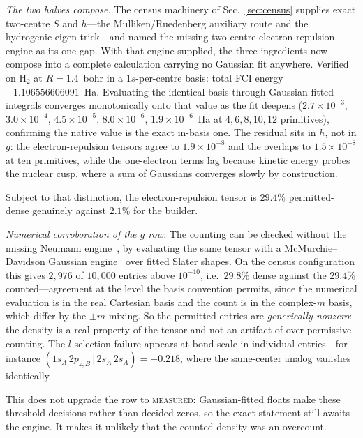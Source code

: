 \documentclass[aps,pra,twocolumn,superscriptaddress,longbibliography]{revtex4-2}
\begin{document}
\emph{The two halves compose.}  The census machinery of
Sec.~\ref{sec:census} supplies exact two-centre $S$ and $h$---the
Mulliken/Ruedenberg auxiliary route and the hydrogenic eigen-trick---and
named the missing two-centre electron-repulsion engine as its one gap.
With that engine supplied, the three ingredients now compose into a
complete calculation carrying no Gaussian fit anywhere.  Verified on
$\mathrm{H}_2$ at $R = 1.4$~bohr in a $1s$-per-centre basis: total FCI
energy $-1.106556606091$~Ha.  Evaluating the identical basis through
Gaussian-fitted integrals converges monotonically onto that value as the
fit deepens ($2.7\times10^{-3}$, $3.0\times10^{-4}$, $4.5\times10^{-5}$,
$8.0\times10^{-6}$, $1.9\times10^{-6}$~Ha at $4, 6, 8, 10, 12$
primitives), confirming the native value is the exact in-basis one.  The residual
sits in $h$, not in $g$: the electron-repulsion tensors agree to
$1.9\times10^{-8}$ and the overlaps to $1.5\times10^{-8}$ at ten
primitives, while the one-electron terms lag because kinetic energy probes
the nuclear cusp, where a sum of Gaussians converges slowly by
construction.

Subject to that distinction, the electron-repulsion tensor is $29.4\%$
permitted-dense genuinely against $2.1\%$ for the builder.

\emph{Numerical corroboration of the $g$ row.} The counting can be checked
without the missing Neumann engine~\cite{ruedenberg1951}, by evaluating
the same tensor with a
McMurchie--Davidson Gaussian engine~\cite{mcmurchie1978} over fitted
Slater shapes.  On the
census configuration this gives $2{,}976$ of $10{,}000$ entries above
$10^{-10}$, i.e.\ $29.8\%$ dense against the $29.4\%$ counted---agreement
at the level the basis convention permits, since the numerical evaluation
is in the real Cartesian basis and the count is in the complex-$m$ basis,
which differ by the $\pm m$ mixing.  So the permitted entries are
\emph{generically nonzero}: the density is a real property of the tensor
and not an artifact of over-permissive counting.  The
$l$-selection failure appears at bond scale in individual entries---for
instance $(1s_A\,2p_{z,B} \,|\, 2s_A\,2s_A) = -0.218$, where the
same-center analog vanishes identically.

This does not upgrade the row to \textsc{measured}: Gaussian-fitted floats
make these threshold decisions rather than decided zeros, so the exact
statement still awaits the engine.  It makes it unlikely that the counted
density was an overcount.
\end{document}
